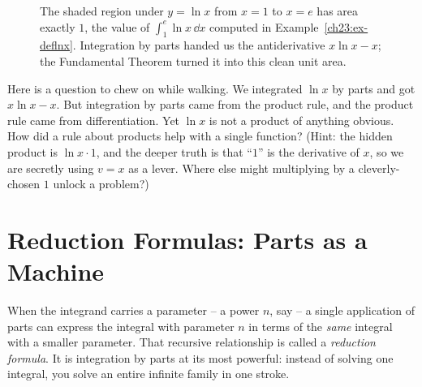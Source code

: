 \begin{figure}[H]
\centering
{}
\caption{The shaded region under $y=\ln x$ from $x=1$ to $x=e$ has area exactly
$1$, the value of $\int_1^e \ln x\,\dd x$ computed in
Example~\ref{ch23:ex-deflnx}. Integration by parts handed us the antiderivative
$x\ln x - x$; the Fundamental Theorem turned it into this clean unit area.}
\label{ch23:fig-lnarea}
\end{figure}

\begin{walkbox}
Here is a question to chew on while walking. We integrated $\ln x$ by parts and
got $x\ln x - x$. But integration by parts came from the product rule, and the
product rule came from differentiation. Yet $\ln x$ is not a product of anything
obvious. How did a rule about products help with a single function? (Hint: the
hidden product is $\ln x \cdot 1$, and the deeper truth is that ``$1$'' is the
derivative of $x$, so we are secretly using $v=x$ as a lever. Where else might
multiplying by a cleverly-chosen $1$ unlock a problem?)
\end{walkbox}

\section{Reduction Formulas: Parts as a Machine}
\label{ch23:reduction}

When the integrand carries a parameter -- a power $n$, say -- a single
application of parts can express the integral with parameter $n$ in terms of the
\emph{same} integral with a smaller parameter. That recursive relationship is
called a \emph{reduction formula}. It is integration by parts at its most
powerful: instead of solving one integral, you solve an entire infinite family in
one stroke.

